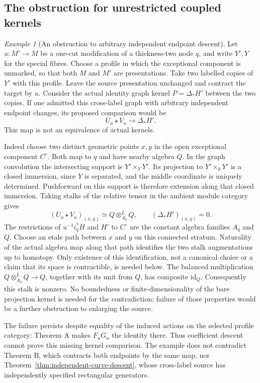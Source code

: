 \documentclass[11pt]{article}
\theoremstyle{definition}
\theoremstyle{remark}
\newtheorem{example}[theorem]{Example}
\begin{document}
\subsection{The obstruction for unrestricted coupled kernels}
\begin{example}[An obstruction to arbitrary independent endpoint descent]
\label{ex:independent-endpoint-obstruction}
Let $u:M'\to M$ be a one-cut modification of a thickness-two node
$q$, and write $Y',Y$ for the special fibres. Choose a profile in
which the exceptional component is unmarked, so that both $M$ and
$M'$ are presentations. Take two labelled copies of $Y'$ with this
profile. Leave the source presentation
unchanged and contract the target by $u$. Consider the actual
identity graph kernel $P=\Delta_*H'$ between the two copies.
If one admitted this cross-label graph with arbitrary independent
endpoint changes, its proposed comparison would be
\[
 U_u\star V_u\longrightarrow\Delta_*H'.
\]
This map is not an equivalence of actual kernels.

Indeed choose two distinct geometric points $x,y$ in the open
exceptional component $C^\circ$. Both map to $q$ and have nearby
algebra $Q$. In the graph convolution the intersecting support is
$Y'\times_Y Y'$. Its projection to $Y'\times_kY'$ is a closed
immersion, since $Y$ is separated, and the middle coordinate is
uniquely determined. Pushforward on this support is therefore
extension along that closed immersion. Taking stalks of the
relative tensor in the ambient module category gives
\[
 (U_u\star V_u)_{(x,y)}\simeq Q\otimes^L_{A_q}Q,
 \qquad (\Delta_*H')_{(x,y)}=0.
\]
The restrictions of $u^{-1}i_q^*H$ and $H'$ to $C^\circ$ are
the constant algebra families $A_q$ and $Q$. Choose an etale path
between $x$ and $y$ on this connected stratum. Naturality of the
actual algebra map along that path identifies the two stalk
augmentations up to homotopy. Only existence of this identification,
not a canonical choice or a claim that its space is contractible,
is needed below.
The balanced multiplication $Q\otimes^L_{A_q}Q\to Q$, together with
its unit from $Q$, has composite $\mathrm{id}_Q$. Consequently this
stalk is nonzero. No boundedness or finite-dimensionality of the bare
projection kernel is needed for the contradiction; failure of those
properties would be a further obstruction to enlarging the source.

The failure persists despite equality of the induced actions on the
selected profile category: Theorem A makes $F_uG_u$ the identity
there. Thus coefficient descent cannot prove this missing kernel
comparison. The example does not contradict Theorem B, which
contracts both endpoints by the same map, nor
Theorem~\ref{thm:independent-curve-descent}, whose cross-label
source has independently specified rectangular generators.
\end{example}
\end{document}

